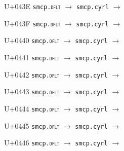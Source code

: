 \documentclass{article}
\begin{document}
\begin{substitutions}
\goodbreak

U+043E  \linebreak
    \texttt{smcp.\textsc{dflt}} $\to$  \linebreak
    \texttt{smcp.cyrl} $\to$  

\goodbreak

U+043F  \linebreak
    \texttt{smcp.\textsc{dflt}} $\to$  \linebreak
    \texttt{smcp.cyrl} $\to$  

\goodbreak

U+0440  \linebreak
    \texttt{smcp.\textsc{dflt}} $\to$  \linebreak
    \texttt{smcp.cyrl} $\to$  

\goodbreak

U+0441  \linebreak
    \texttt{smcp.\textsc{dflt}} $\to$  \linebreak
    \texttt{smcp.cyrl} $\to$  

\goodbreak

U+0442  \linebreak
    \texttt{smcp.\textsc{dflt}} $\to$  \linebreak
    \texttt{smcp.cyrl} $\to$  

\goodbreak

U+0443  \linebreak
    \texttt{smcp.\textsc{dflt}} $\to$  \linebreak
    \texttt{smcp.cyrl} $\to$  

\goodbreak

U+0444  \linebreak
    \texttt{smcp.\textsc{dflt}} $\to$  \linebreak
    \texttt{smcp.cyrl} $\to$  

\goodbreak

U+0445  \linebreak
    \texttt{smcp.\textsc{dflt}} $\to$  \linebreak
    \texttt{smcp.cyrl} $\to$  

\goodbreak

U+0446  \linebreak
    \texttt{smcp.\textsc{dflt}} $\to$  \linebreak
    \texttt{smcp.cyrl} $\to$  


\end{substitutions}
\end{document}
